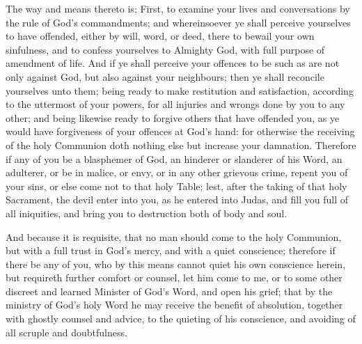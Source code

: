 The way and means thereto is; First, to examine your lives and conversations by the rule of God's commandments; and whereinsoever ye shall perceive yourselves to have offended, either by will, word, or deed, there to bewail your own sinfulness, and to confess yourselves to Almighty God, with full purpose of amendment of life. And if ye shall perceive your offences to be such as are not only against God, but also against your neighbours; then ye shall reconcile yourselves unto them; being ready to make restitution and satisfaction, according to the uttermost of your powers, for all injuries and wrongs done by you to any other; and being likewise ready to forgive others that have offended you, as ye would have forgiveness of your offences at God's hand: for otherwise the receiving of the holy Communion doth nothing else but increase your damnation. Therefore if any of you be a blasphemer of God, an hinderer or slanderer of his Word, an adulterer, or be in malice, or envy, or in any other grievous crime, repent you of your sins, or else come not to that holy Table; lest, after the taking of that holy Sacrament, the devil enter into you, as he entered into Judas, and fill you full of all iniquities, and bring you to destruction both of body and soul.

And because it is requisite, that no man should come to the holy Communion, but with a full trust in God's mercy, and with a quiet conscience; therefore if there be any of you, who by this means cannot quiet his own conscience herein, but requireth further comfort or counsel, let him come to me, or to some other discreet and learned Minister of God's Word, and open his grief; that by the ministry of God's holy Word he may receive the benefit of absolution, together with ghostly counsel and advice, to the quieting of his conscience, and avoiding of all scruple and doubtfulness.


